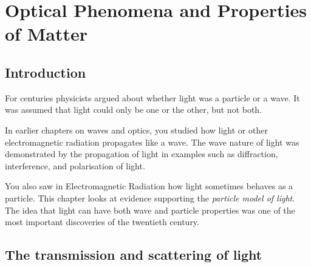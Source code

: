 \chapter{Optical Phenomena and Properties of Matter}
\label{p:mm:op12}



\section {Introduction}
For centuries physicists argued about whether light was a particle or a wave. It was assumed that light could only be one or the other, but not both.
 

In earlier chapters on waves and optics, you studied how light or other electromagnetic radiation propagates like a wave. The wave nature of light was demonstrated by the propagation of light in examples such as diffraction, interference, and polarisation of light.

 
You also saw in Electromagnetic Radiation how light sometimes behaves as a particle. This chapter looks at evidence supporting the \textit{particle model of light}. The idea that light can have both wave and particle properties was one of the most important discoveries of the twentieth century.\\
\section{The transmission and scattering of light}

